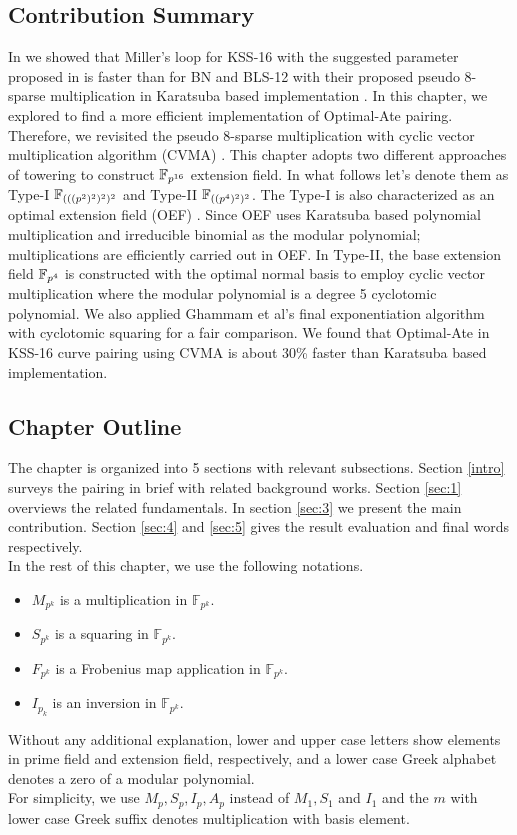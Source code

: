 \subsection{Contribution Summary}
In \cite{INDOCRYPT:KNGDNK17} we showed that Miller's loop for KSS-16 with the suggested parameter proposed in \cite{EPRINT:BarDuq17} is faster than for BN and BLS-12 with their proposed pseudo 8-sparse multiplication in Karatsuba based implementation \cite{INDOCRYPT:KNGDNK17}.
In this chapter, we explored to find a more efficient implementation of Optimal-Ate pairing. 
Therefore, we revisited the pseudo 8-sparse multiplication with cyclic vector multiplication algorithm (CVMA) \cite{cvma_kato}.
This chapter adopts two different approaches of towering to construct $\mathbb{F}_{p^{16}}$ extension field. 
In what follows let's denote them as Type-I $\mathbb{F}_{(((p^2)^2)^2)^2}$ and Type-II  $\mathbb{F}_{((p^4)^2)^2}$.
The Type-I is also characterized as an optimal extension field (OEF) \cite{JC:BaiPaa01}.
Since OEF uses Karatsuba based polynomial multiplication and irreducible binomial as the modular polynomial;  multiplications are efficiently carried out in OEF. 
In Type-II,  the base extension field $\mathbb{F}_{p^4}$ is constructed with the optimal normal basis to employ cyclic vector multiplication where the modular polynomial is a degree 5 cyclotomic polynomial.
We also applied Ghammam et al's \cite{EPRINT:GhaFou16b} final exponentiation algorithm with cyclotomic squaring \cite{DBLP:journals/moc/Karabina13} for a fair comparison.
We found that Optimal-Ate in KSS-16 curve pairing using CVMA is about 30\% faster than Karatsuba based implementation.

\subsection{Chapter Outline}
The chapter is organized into 5 sections with relevant subsections.
Section \ref{intro} surveys the pairing in brief with related background works.
Section \ref{sec:1} overviews the related fundamentals.
In section \ref{sec:3} we present the main contribution.
Section \ref{sec:4} and \ref{sec:5} gives the result evaluation and final words respectively. \\
In the rest of this chapter, we use the following notations.
 \begin{itemize}
   \item $M_{p^k}$ is a multiplication in  $\mathbb{F}_{p^{k}}$.
   \item $S_{p^k}$ is a squaring in  $\mathbb{F}_{p^{k}}$.
   \item $F_{p^k}$ is a Frobenius map application in  $\mathbb{F}_{p^{k}}$.
   \item $I_{p_k}$ is an inversion in  $\mathbb{F}_{p^{k}}$.
\end{itemize}
Without any additional explanation, lower and upper case letters show elements in prime field and extension field, respectively, and a lower case Greek alphabet denotes a zero of a modular polynomial.\\
For simplicity, we use $M_p, S_p, I_p, A_p$ instead of $M_1, S_1$ and $I_1$ and 
the $m$ with lower case Greek suffix denotes multiplication with basis element.

